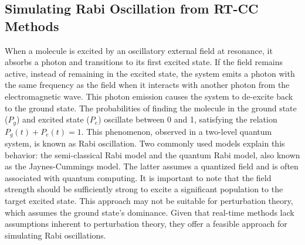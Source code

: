 \subsection{Simulating Rabi Oscillation from RT-CC Methods} \label{theory-cc3-3}
When a molecule is excited by an oscillatory external field at resonance, it absorbs a photon and transitions to its first excited state. If the field remains active, instead of remaining in the excited state, the system emits a photon with the same frequency as the field when it interacts with another photon from the electromagnetic wave. This photon emission causes the system to de-excite back to the ground state. The probabilities of finding the molecule in the ground state ($P_{g}$) and excited state ($P_{e}$) oscillate between 0 and 1, satisfying the relation $P_{g}(t) + P_{e}(t) = 1$. This phenomenon, observed in a two-level quantum system, is known as Rabi oscillation.\cite{Rabi1937} Two commonly used models explain this behavior: the semi-classical Rabi model\cite{Gerry2005} and the quantum Rabi model, also known as the Jaynes-Cummings model.\cite{Shore1993} The latter assumes a quantized field and is often associated with quantum computing. It is important to note that the field strength should be sufficiently strong to excite a significant population to the target excited state. This approach may not be suitable for perturbation theory, which assumes the ground state's dominance. Given that real-time methods lack assumptions inherent to perturbation theory, they offer a feasible approach for simulating Rabi oscillations.

